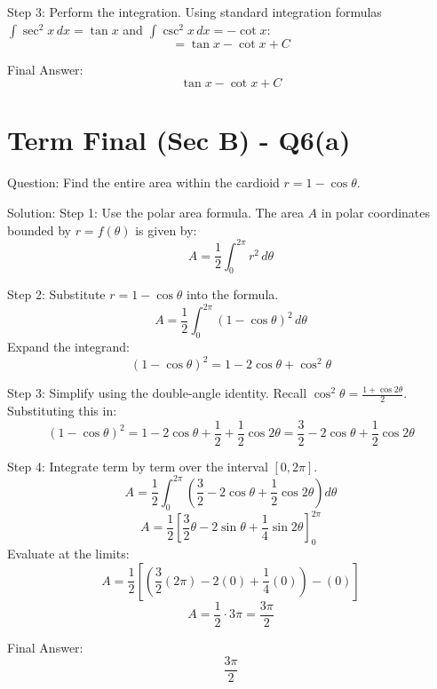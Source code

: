 \documentclass{article}
\begin{document}
Step 3: Perform the integration.
Using standard integration formulas $\int \sec^2 x \, dx = \tan x$ and $\int \csc^2 x \, dx = -\cot x$:
\[
= \tan x - \cot x + C
\]

Final Answer:
\[
\boxed{\tan x - \cot x + C}
\]

\section*{Term Final (Sec B) - Q6(a)}
Question:
Find the entire area within the cardioid $r = 1 - \cos \theta$.

Solution:
Step 1: Use the polar area formula.
The area $A$ in polar coordinates bounded by $r = f(\theta)$ is given by:
\[
A = \frac{1}{2} \int_{0}^{2\pi} r^2 \, d\theta
\]

Step 2: Substitute $r = 1 - \cos \theta$ into the formula.
\[
A = \frac{1}{2} \int_{0}^{2\pi} (1 - \cos \theta)^2 \, d\theta
\]
Expand the integrand:
\[
(1 - \cos \theta)^2 = 1 - 2\cos \theta + \cos^2 \theta
\]

Step 3: Simplify using the double-angle identity.
Recall $\cos^2 \theta = \frac{1 + \cos 2\theta}{2}$.
Substituting this in:
\[
(1 - \cos \theta)^2 = 1 - 2\cos \theta + \frac{1}{2} + \frac{1}{2}\cos 2\theta = \frac{3}{2} - 2\cos \theta + \frac{1}{2}\cos 2\theta
\]

Step 4: Integrate term by term over the interval $[0, 2\pi]$.
\[
A = \frac{1}{2} \int_{0}^{2\pi} \left( \frac{3}{2} - 2\cos \theta + \frac{1}{2}\cos 2\theta \right) d\theta
\]
\[
A = \frac{1}{2} \left[ \frac{3}{2}\theta - 2\sin \theta + \frac{1}{4}\sin 2\theta \right]_0^{2\pi}
\]
Evaluate at the limits:
\[
A = \frac{1}{2} \left[ \left( \frac{3}{2}(2\pi) - 2(0) + \frac{1}{4}(0) \right) - (0) \right]
\]
\[
A = \frac{1}{2} \cdot 3\pi = \frac{3\pi}{2}
\]

Final Answer:
\[
\boxed{\frac{3\pi}{2}}
\]

\end{document}
